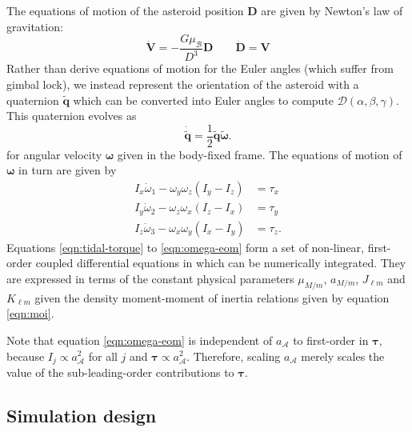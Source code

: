 \documentclass[fleqn,usenatbib]{mnras}
\newcommand{\quat}[1]{\widetilde{\bm{#1}}}
\begin{document}
The equations of motion of the asteroid position $\bm D$ are given by Newton's law of gravitation:
\begin{equation}
  \dot{\bm V} = -\frac{G \mu_\mathcal{B}}{D^3} \bm D \qquad \dot{\bm D} = \bm V
  \label{eqn:pos-eom}
\end{equation}
Rather than derive equations of motion for the Euler angles (which suffer from gimbal lock), we instead represent the orientation of the asteroid with a quaternion $\quat q$ which can be converted into Euler angles to compute $\mathcal{D}(\alpha, \beta, \gamma)$. This quaternion evolves as 
\begin{equation}
  \dot{\quat q} = \frac{1}{2}\quat q\quat \omega.
  \label{eqn:quat-eom}
\end{equation}
for angular velocity $\bm \omega$ given in the body-fixed frame. The equations of motion of $\bm \omega$ in turn are given by
\begin{equation}
  \begin{split}
    I_x \dot \omega_1 - \omega_y \omega_z (I_y - I_z) &= \tau_x\\
    I_y \dot \omega_2 - \omega_z \omega_x (I_z - I_x) &= \tau_y\\
    I_z \dot \omega_3 - \omega_x \omega_y (I_x - I_y) &= \tau_z.
  \end{split}
  \label{eqn:omega-eom}
\end{equation}
Equations \ref{eqn:tidal-torque} to \ref{eqn:omega-eom} form a set of non-linear, first-order coupled differential equations in which can be numerically integrated. They are expressed in terms of the constant physical parameters $\mu_{M/m}$, $a_{M/m}$, $J_{\ell m}$ and $K_{\ell m}$ given the density moment-moment of inertia relations given by equation \ref{eqn:moi}.

Note that equation \ref{eqn:omega-eom} is independent of $a_\mathcal{A}$ to first-order in $\bm \tau$, because $I_{j} \propto a_\mathcal{A}^2$ for all $j$ and $\bm \tau \propto a_\mathcal{A}^2$. Therefore, scaling $a_\mathcal{A}$ merely scales the value of the sub-leading-order contributions to $\bm \tau$.


\subsection{Simulation design}
\label{sec:sim}
\end{document}
